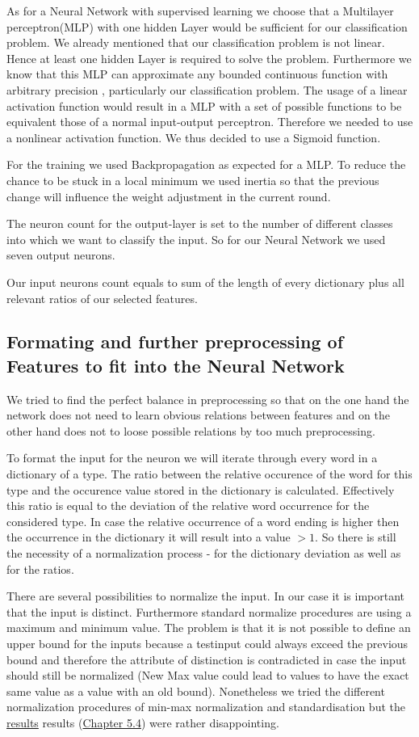 \documentclass[paper=A4,pagesize=auto,11pt,headinclude=true,footinclude=true,BCOR=0mm,DIV=calc]{scrartcl}
\begin{document}
	As for a Neural Network with supervised learning we choose that a Multilayer perceptron(MLP) with one hidden Layer would be sufficient for our classification problem. We already mentioned that our classification problem is not linear. Hence at least one hidden Layer is required to solve the problem. Furthermore we know that this MLP can approximate any bounded continuous function with arbitrary precision \cite{ApproximateAnyFunction}, particularly our classification problem.
	The usage of a linear activation function would result in a MLP with a set of possible functions to be equivalent those of a normal input-output perceptron. Therefore we needed to use a nonlinear activation function. We thus decided to use a Sigmoid function. 
	
	For the training we used Backpropagation as expected for a MLP. To reduce the chance to be stuck in a local minimum we used inertia so that the previous change will influence the weight adjustment in the current round.
	
	The neuron count for the output-layer is set to the number of different classes into which we want to classify the input. So for our Neural Network we used seven output neurons.
	
	Our input neurons count equals to sum of the length of every dictionary plus all relevant ratios of our selected features.
	
	\subsection{Formating and further preprocessing of Features to fit into the Neural Network}
	We tried to find the perfect balance in preprocessing so that on the one hand the network does not need to learn obvious relations between features and on the other hand does not to loose possible relations by too much preprocessing.
	
	To format the input for the neuron we will iterate through every word in a dictionary of a type. The ratio between the relative occurence of the word for this type and the occurence value stored in the dictionary is calculated. Effectively this ratio is equal to the deviation of the relative word occurrence for the considered type. In case the relative occurrence of a word ending is higher then the occurrence in the dictionary it will result into a value $> 1$. So there is still the necessity of a normalization process - for the dictionary deviation as well as for the ratios.
	
	There are several possibilities to normalize the input. In our case it is important that the input is distinct. Furthermore standard normalize procedures are using a maximum and minimum value. The problem is that it is not possible to define an upper bound for the inputs because a testinput could always exceed the previous bound and therefore the attribute of distinction is contradicted in case the input should still be normalized (New Max value could lead to values to have the exact same value as a value with an old bound). Nonetheless we tried the different normalization procedures of min-max normalization and standardisation but the \hyperref[src:optimizing]{results} results (\hyperref[src:optimizing]{Chapter 5.4}) were rather disappointing.
	
\end{document}

